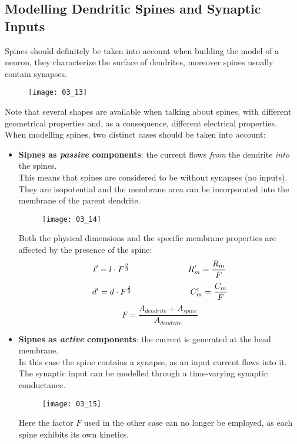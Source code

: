 \subsection{Modelling Dendritic Spines and Synaptic Inputs}
Spines should definitely be taken into account when building the model of a neuron, they
characterize the surface of dendrites, moreover spines usually contain synapses.
\begin{figure}[H]
    \texttt{[image: 03\_13]}
    \centering
\end{figure}
Note that several shapes are available when talking about spines, with different
geometrical properties and, as a consequence, different electrical properties.\\
When modelling spines, two distinct cases should be taken into account:
\begin{itemize}
    \item \textbf{Sipnes as \textit{passive} components}: the current flows \textit{from}
          the dendrite \textit{into} the spines.\\
          This means that spines are considered to be without synapses (no inputs). They are
          isopotential and the membrane area can be incorporated into the membrane of the parent dendrite.
          \begin{figure}[H]
              \texttt{[image: 03\_14]}
              \centering
          \end{figure}
          Both the physical dimensions and the specific membrane properties are affected by the presence
          of the spine:
          \begin{equation*}
              l'=l\cdot{F^{\frac{2}{3}}}
              \hspace{2.5cm}
              R_{m}'=\frac{R_{m}}{F}
          \end{equation*}
          \begin{equation*}
              d'=d\cdot{F^{\frac{2}{3}}}
              \hspace{2.5cm}
              C_{m}'=\frac{C_{m}}{F}
          \end{equation*}
          \begin{equation*}
              F=\frac{A_{dendrite}+A_{spine}}{A_{dendrite}}
          \end{equation*}
    \item \textbf{Sipnes as \textit{active} components}: the current is generated at the head membrane.\\
          In this case the spine contains a synapse, as an input current flows into it. The synaptic input
          can be modelled through a time-varying synaptic conductance.
          \begin{figure}[H]
              \texttt{[image: 03\_15]}
              \centering
          \end{figure}
          Here the factor \(F\) used in the
          other case can no longer be employed, as each spine exhibits its own kinetics.
\end{itemize}